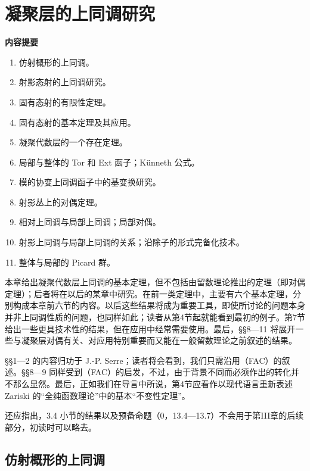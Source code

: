 \renewcommand{\B}{\mathscr B}
\setcounter{chapter}{2}
\chapter{凝聚层的上同调研究}
\begin{center}\textbf{内容提要}\end{center}
\begin{enumerate}[label=\S\,\arabic*.,leftmargin=2.8em]
\item 仿射概形的上同调。
\item 射影态射的上同调研究。
\item 固有态射的有限性定理。
\item 固有态射的基本定理及其应用。
\item 凝聚代数层的一个存在定理。
\item 局部与整体的 Tor 和 Ext 函子；Künneth 公式。
\item 模的协变上同调函子中的基变换研究。
\item 射影丛上的对偶定理。
\item 相对上同调与局部上同调；局部对偶。
\item 射影上同调与局部上同调的关系；沿除子的形式完备化技术。
\item 整体与局部的 Picard 群。
\end{enumerate}

本章给出凝聚代数层上同调的基本定理，但不包括由留数理论推出的定理（即对偶定理）；后者将在以后的某章中研究。在前一类定理中，主要有六个基本定理，分别构成本章前六节的内容。以后这些结果将成为重要工具，即使所讨论的问题本身并非上同调性质的问题，也同样如此；读者从第4节起就能看到最初的例子。第7节给出一些更具技术性的结果，但在应用中经常需要使用。最后，§§8—11 将展开一些与凝聚层对偶有关、对应用特别重要而又能在一般留数理论之前叙述的结果。

§§1—2 的内容归功于 J.-P. Serre；读者将会看到，我们只需沿用（FAC）的叙述。§§8—9 同样受到（FAC）的启发，不过，由于背景不同而必须作出的转化并不那么显然。最后，正如我们在导言中所说，第4节应看作以现代语言重新表述 Zariski 的“全纯函数理论”中的基本“不变性定理”。

还应指出，3.4 小节的结果以及预备命题（0，13.4—13.7）不会用于第III章的后续部分，初读时可以略去。

\section{仿射概形的上同调}
